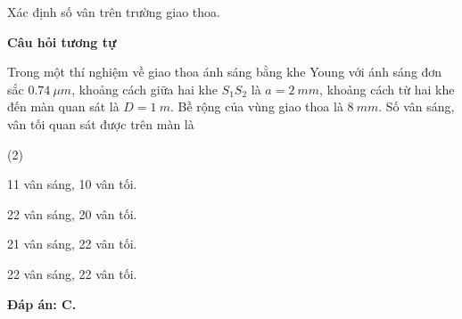 \begin{dang}{Xác định số vân trên trường giao thoa.}
{		\begin{center}
			\textbf{Câu hỏi tương tự}
		\end{center}
		
Trong một thí nghiệm về giao thoa ánh sáng bằng khe Young với ánh sáng đơn sắc $ \SI{0,74}{\mu m} $, khoảng cách giữa hai khe $ S_{1} S_{2} $ là $ a = \SI{2}{mm} $, khoảng cách từ hai khe đến màn quan sát là $ D = \SI{1}{m} $. Bề rộng của vùng giao thoa là $ \SI{8}{mm} $. Số vân sáng, vân tối quan sát được trên màn là
\begin{mcq}(2)
	\item 11 vân sáng, 10 vân tối.        
	\item 22 vân sáng, 20 vân tối.
	\item 21 vân sáng, 22 vân tối.          
	\item 22 vân sáng, 22 vân tối.
\end{mcq}
		\textbf{Đáp án: C.}
	}
\end{dang}






